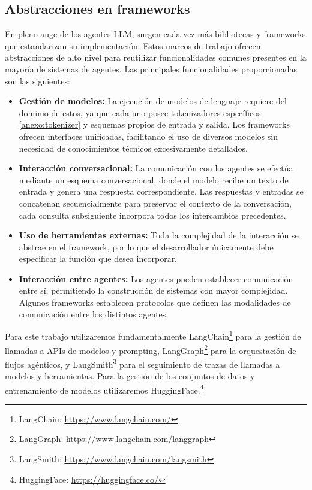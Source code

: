 


\subsection{Abstracciones en frameworks}
En pleno auge de los agentes LLM, surgen cada vez más bibliotecas y frameworks que estandarizan su implementación. Estos marcos de trabajo ofrecen abstracciones de alto nivel para reutilizar funcionalidades comunes presentes en la mayoría de sistemas de agentes.
Las principales funcionalidades proporcionadas son las siguientes: 
\begin{itemize}
\item {\textbf{Gestión de modelos:}} La ejecución de modelos de lenguaje requiere del dominio de estos, ya que cada uno posee tokenizadores específicos \ref{anexo:tokenizer} y esquemas propios de entrada y salida. Los frameworks ofrecen interfaces unificadas, facilitando el uso de diversos modelos sin necesidad de conocimientos técnicos excesivamente detallados.
\item {\textbf{Interacción conversacional:}} La comunicación con los agentes se efectúa mediante un esquema conversacional, donde el modelo recibe un texto de entrada y genera una respuesta correspondiente. Las respuestas y entradas se concatenan secuencialmente para preservar el contexto de la conversación, cada consulta subsiguiente incorpora todos los intercambios precedentes.
\item {\textbf{Uso de herramientas externas:}} Toda la complejidad de la interacción se abstrae en el framework, por lo que el desarrollador únicamente debe especificar la función que desea incorporar.
\item {\textbf{Interacción entre agentes:}} Los agentes pueden establecer comunicación entre sí, permitiendo la construcción de sistemas con mayor complejidad. Algunos frameworks establecen protocolos que definen las modalidades de comunicación entre los distintos agentes.
\end{itemize}

Para este trabajo utilizaremos fundamentalmente LangChain\footnote{LangChain: \url{https://www.langchain.com/}} para la gestión de llamadas a APIs de modelos y prompting, LangGraph\footnote{LangGraph: \url{https://www.langchain.com/langgraph}} para la orquestación de flujos agénticos, y LangSmith\footnote{LangSmith: \url{https://www.langchain.com/langsmith}} para el seguimiento de trazas de llamadas a modelos y herramientas. Para la gestión de los conjuntos de datos y entrenamiento de modelos utilizaremos HuggingFace.\footnote{HuggingFace: \url{https://huggingface.co/}} 

